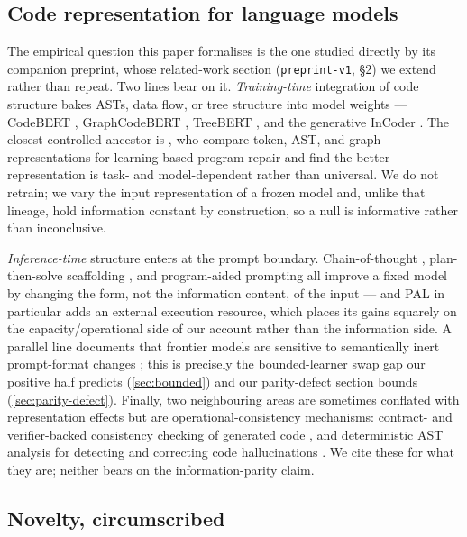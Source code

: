 \subsection{Code representation for language models}
\label{subsec:rw-code}

The empirical question this paper formalises is the one studied directly by its
companion preprint, whose related-work section (\texttt{preprint-v1}, §2) we
extend rather than repeat. Two lines bear on it. \emph{Training-time} integration
of code structure bakes ASTs, data flow, or tree structure into model weights ---
CodeBERT \citep{feng2020codebert}, GraphCodeBERT \citep{guo2021graphcodebert},
TreeBERT \citep{jiang2021treebert}, and the generative InCoder
\citep{fried2023incoder}. The closest controlled ancestor is
\citet{namavar2022coderepr}, who compare token, AST, and graph representations for
learning-based program repair and find the better representation is task- and
model-dependent rather than universal. We do not retrain; we vary the input
representation of a frozen model and, unlike that lineage, hold information
constant by construction, so a null is informative rather than inconclusive.

\emph{Inference-time} structure enters at the prompt boundary. Chain-of-thought
\citep{wei2022chainofthought}, plan-then-solve scaffolding
\citep{wang2023plansolve}, and program-aided prompting \citep{gao2023pal} all
improve a fixed model by changing the form, not the information content, of the
input --- and PAL in particular adds an external execution resource, which places
its gains squarely on the capacity/operational side of our account rather than the
information side. A parallel line documents that frontier models are sensitive to
semantically inert prompt-format changes \citep{sclar2024promptformatting,
salinas2024butterfly}; this is precisely the bounded-learner swap gap our positive
half predicts (\cref{sec:bounded}) and our parity-defect section bounds
(\cref{sec:parity-defect}). Finally, two neighbouring areas are sometimes
conflated with representation effects but are operational-consistency mechanisms:
contract- and verifier-backed consistency checking of generated code
\citep{sun2024clover}, and deterministic AST analysis for detecting and correcting
code hallucinations \citep{khati2026asthallucination}. We cite these for what they
are; neither bears on the information-parity claim.

\subsection{Novelty, circumscribed}
\label{subsec:rw-novelty}


